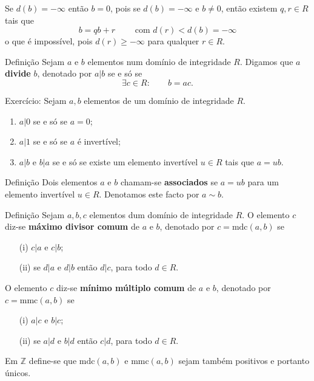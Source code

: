 \documentclass{beamer}
\newcommand{\ZZ}{\mathbb Z}
\newcommand{\mdc}[2]{\mathrm{mdc}({#1}, {#2})}
\newcommand{\mmc}[2]{\mathrm{mmc}({#1}, {#2})}
\begin{document}
\begin{frame}
Se $d(b)=-\infty$ então $b=0$, pois se $d(b)=-\infty$ e $b\neq 0$, então existem $q,r \in R$ tais que 
$$ b=qb+r \qquad \mbox{ com } d(r) < d(b)=-\infty$$
o que é impossível, pois $d(r)\geq -\infty$ para qualquer $r\in R$.
\end{frame}

\begin{frame}
\begin{block}{Definição}
Sejam $a$ e $b$ elementos num domínio de integridade $R$. Digamos que $a$ {\bf divide} $b$, denotado por $a|b$ se e só se 
$$ \exists c\in R: \qquad b=ac.$$
\end{block}
\pause

Exercício: Sejam $a,b$ elementos de um domínio de integridade $R$.
\begin{enumerate}
\item $a|0$ se e só se $a=0$;\pause
\item $a|1$ se e só se $a$ é invertível;\pause
\item $a|b$ e $b|a$ se e só se existe um elemento invertível $u\in R$ tais que $a=ub$.\pause
\end{enumerate}

\begin{block}{Definição}
Dois elementos $a$ e $b$ chamam-se {\bf associados} se $a=ub$ para um elemento invertível $u\in R$. Denotamos este facto por $a\sim b$.
\end{block}
\end{frame}


\begin{frame}
\begin{block}{Definição}
Sejam $a,b,c$ elementos dum domínio de integridade $R$. O elemento $c$ diz-se {\bf máximo divisor comum} de $a$ e $b$, denotado por $c=\mdc{a}{b}$ se 
\begin{enumerate}
\item[(i)] $c|a$ e $c|b$;
\item[(ii)] se $d|a$ e $d|b$ então $d|c$, para todo $d\in R$.
\end{enumerate}

\pause O elemento $c$ diz-se {\bf mínimo múltiplo comum} de $a$ e $b$, denotado por $c=\mmc{a}{b}$ se 
\begin{enumerate}
\item[(i)] $a|c$ e $b|c$;
\item[(ii)] se $a|d$ e $b|d$ então $c|d$, para todo $d\in R$.
\end{enumerate}\pause
Em $\ZZ$ define-se que $\mdc{a}{b}$ e $\mmc{a}{b}$ sejam também positivos e portanto únicos.

\end{block}

\end{frame}
\end{document}
